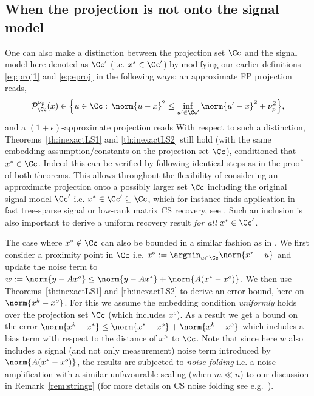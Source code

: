 



\subsection{When the projection is not onto the signal model}\label{sec:inexactmodel}

 One can also make a distinction between  the projection set $\Cc$ and the signal model here denoted as $\Cc'$ (i.e. $x^\gt\in\Cc'$) by modifying our earlier definitions \eqref{eq:proj1} and \eqref{eq:eproj} in the following ways:
an approximate FP projection reads, 
\begin{align}
\pp_\Cc^{\nup}(x) \in \Big\{ u\in \Cc :\,	\norm{u-x}^2 \leq \inf_{u'\in \Cc'}\norm{u'-x}^2 +\nup^2  \Big\},\label{eq:proj1-1}
\end{align} 
and a $(1+\epsilon)$-approximate projection reads
With respect to such a distinction,  Theorems~\ref{th:inexactLS1} and \ref{th:inexactLS2} still hold (with the same embedding assumption/constants on the projection set $\Cc$), conditioned that $x^\gt\in \Cc$.
Indeed this can be verified by following identical steps as in the proof of both theorems.
This allows throughout the flexibility of considering an approximate projection onto a possibly larger set $\Cc$ including the original signal model $\Cc'$ i.e. $x^\gt \in \Cc'\subseteq \Cc$, which for instance finds application in fast tree-sparse signal or low-rank matrix CS recovery, see \cite{HegdeISIT,MatrixAlpsapprox}. Such an inclusion is also important to derive a uniform recovery result \emph{for all} $x^*\in\Cc'$. 

The case where $x^\gt \notin \Cc$ can also be bounded in a similar fashion as in \cite{Blumen}. We first consider a proximity point in $\Cc$ i.e. $x^{o}:=\argmin_{u\in\Cc} \norm{x^\gt-u}$  and update the noise term  to $w:=\norm{y-Ax^{o}}\leq \norm{y-Ax^\gt}+\norm{A(x^\gt-x^{o})} $. We then use Theorems~\ref{th:inexactLS1} and \ref{th:inexactLS2} to derive an error bound, here on $\norm{x^k-x^{o}}$. For this we assume the embedding condition \emph{uniformly} holds over the projection set $\Cc$ (which includes $x^{o}$). As a result we get a bound on the error $\norm{x^k-x^\gt} \leq \norm{x^\gt-x^{o}}+\norm{x^k-x^{o}}$ which includes a bias term with respect to the distance of $x^\gt$ to $\Cc$. Note that since here $w$ also includes a signal (and not only measurement) noise term introduced by  $\norm{A(x^\gt-x^{o})}$, the results are subjected to \emph{noise folding} i.e. a noise amplification 
with a similar unfavourable scaling (when $m \ll n$) to our discussion in Remark~\ref{rem:stringe} (for more details on CS noise folding see e.g.~\cite{eldar:noisefolding,daven:noisefolding}). 


